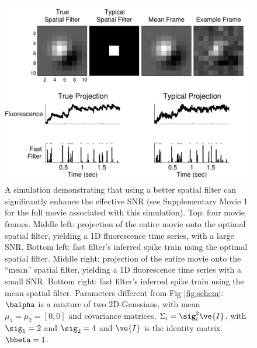 \begin{figure}[H]
\centering \includegraphics[width=.9\linewidth]{../graphics/spatial}
\caption{A simulation demonstrating that using a better spatial filter can significantly enhance the effective SNR (see Supplementary Movie 1 for the full movie associated with this simulation).  Top: four movie frames.  Middle left: projection of the entire movie onto the optimal spatial filter, yielding a 1D fluorescence time series, with a large SNR. Bottom left: fast filter's inferred spike train using the optimal spatial filter.  Middle right: projection of the entire movie onto the ``mean'' spatial filter, yielding a 1D fluorescence time series with a small SNR. Bottom right: fast filter's inferred spike train using the mean spatial filter. Parameters different from Fig \ref{fig:schem}: $\balpha$ is a mixture of two 2D-Gaussians, with mean $\mu_1=\mu_2=[0, 0]$ and covariance matrices, $\Sigma_i=\sig_i^2 \ve{I}$, with $\sig_1=2$ and $\sig_2=4$ and $\ve{I}$ is the identity matrix. $\bbeta=1$.} \label{fig:spatial} \end{figure} 

